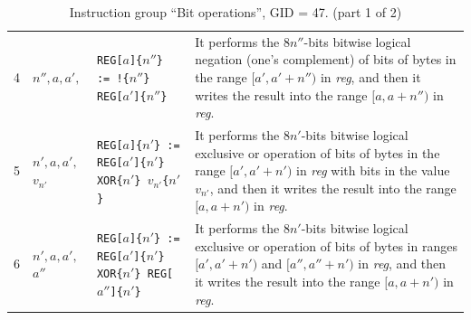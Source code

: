\documentclass[10pt,twocolumn]{article}
\begin{document}
\begin{table}[!h]
\begin{center}
\begin{tabular}{lp{1.2cm}p{5.5cm}p{7.5cm}}
4 & $ n'',a,a',$ %
& \texttt{REG[}$ a $\texttt{]\{}$ n'' $\texttt{\} := !\{}$ n'' $\texttt{\}
REG[}$ a' $\texttt{]\{}$ n'' $\texttt{\}} %
& It performs the $ 8n'' $-bits bitwise logical negation (one's complement) of
bits of bytes in the range $ [a',a'+n'') $ in \textit{reg}, and then it writes
the result into the range $ [a,a+n'') $ in \textit{reg}. \\

5 & $ n',a,a',$ \newline $ v_{n'} $ %
& \texttt{REG[}$ a $\texttt{]\{}$ n' $\texttt{\} := REG[}$ a' $\texttt{]\{}$
n' $\texttt{\} XOR\{}$ n' $\texttt{\} }$ v_{n'} $\texttt{\{}$ n' $\texttt{\}}
%
& It performs the $ 8n' $-bits bitwise logical exclusive or operation of bits of
bytes in the range $ [a',a'+n') $ in \textit{reg} with bits in the value $
v_{n'} $, and then it writes the result into the range $ [a,a+n') $ in
\textit{reg}. \\

6 & $ n',a,a',$ \newline $ a'' $ %
& \texttt{REG[}$ a $\texttt{]\{}$ n' $\texttt{\} := REG[}$ a' $\texttt{]\{}$
n' $\texttt{\} XOR\{}$ n' $\texttt{\} REG[}$ a'' $\texttt{]\{}$ n'
$\texttt{\}} %
& It performs the $ 8n' $-bits bitwise logical exclusive or operation of bits of
bytes in ranges $ [a',a'+n') $ and $ [a'',a''+n') $ in \textit{reg}, and then it
writes the result into the range $ [a,a+n') $ in \textit{reg}. \\

\end{tabular}
\end{center}
\caption{Instruction group ``Bit operations'', GID = 47. (part 1 of 2)}
\label{tab:igroup:binaryoperations}
\end{table}

\clearpage
\end{document}
